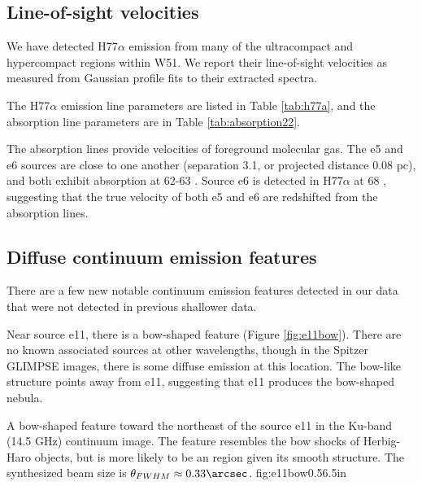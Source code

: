 

\subsection{Line-of-sight velocities}
\label{sec:LOSvelo}
We have detected H77$\alpha$ emission from many of the ultracompact and
hypercompact \hii regions within W51.  We report their line-of-sight velocities
as measured from Gaussian profile fits to their extracted spectra.

The H77$\alpha$ emission line parameters are listed in Table \ref{tab:h77a}, and
the \para \twotwo absorption line parameters are in Table \ref{tab:absorption22}.

The \formaldehyde absorption lines provide velocities of foreground molecular
gas.  The e5 and e6 sources are close to one another (separation 3.1\arcsec,
or projected distance 0.08 pc), and both exhibit \formaldehyde absorption at
62-63 \kms.  Source e6 is detected in H77$\alpha$ at 68 \kms, suggesting that
the true velocity of both e5 and e6 are redshifted from the \formaldehyde
absorption lines. 






\subsection{Diffuse continuum emission features}
\label{sec:diffuseemission}
There are a few new notable continuum emission features detected in our data
that were not detected in previous shallower data.

Near source e11, there is a bow-shaped feature (Figure \ref{fig:e11bow}).
There are no known associated sources at other wavelengths, though in the
Spitzer GLIMPSE
\citep{Benjamin2003a} images, there is some diffuse emission at this location.
The bow-like structure points away from e11, suggesting that e11 produces the
bow-shaped nebula.

{A bow-shaped feature toward the northeast of the source e11 in the Ku-band
(14.5 GHz)
continuum image.  The feature resembles the bow shocks of Herbig-Haro objects,
but is more likely to be an \hii region given its smooth structure.
The synthesized beam size is
$\theta_{FWHM}\approx0.33\arcsec$.
}
{fig:e11bow}{0.5}{6.5in}

